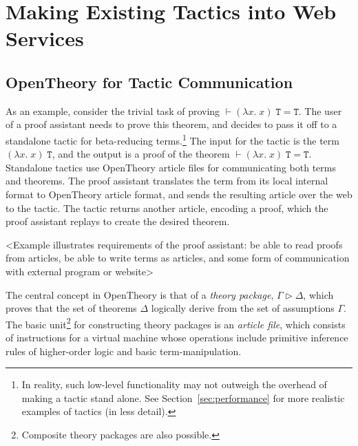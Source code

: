 \documentclass{llncs}
\newcommand{\OpenTheory}{OpenTheory\xspace}
\newcommand{\secref}[1]{Section~\ref{sec:#1}}
\begin{document}
\section{Making Existing Tactics into Web Services}
\label{sec:implementation}

\subsection{\OpenTheory for Tactic Communication}
As an example, consider the trivial task of proving $\vdash(\lambda{x}.\;x)\;\mathtt{T}=\mathtt{T}$.
The user of a proof assistant needs to prove this theorem, and decides to pass it off to a standalone tactic for beta-reducing terms.\footnote{In reality, such low-level functionality may not outweigh the overhead of making a tactic stand alone. See \secref{performance} for more realistic examples of tactics (in less detail).}
The input for the tactic is the term $(\lambda{x}.\;x)\;\mathtt{T}$, and the output is a proof of the theorem $\vdash(\lambda{x}.\;x)\;\mathtt{T}=\mathtt{T}$.
Standalone tactics use \OpenTheory article files for communicating both terms and theorems.
The proof assistant translates the term from its local internal format to \OpenTheory article format, and sends the resulting article over the web to the tactic.
The tactic returns another article, encoding a proof, which the proof assistant replays to create the desired theorem.

<Example illustrates requirements of the proof assistant: be able to read proofs from articles, be able to write terms as articles, and some form of communication with external program or website>

The central concept in \OpenTheory is that of a \emph{theory package}, $\Gamma\rhd\Delta$, which proves that the set of theorems $\Delta$ logically derive from the set of assumptions $\Gamma$.
The basic unit\footnote{Composite theory packages are also possible.} for constructing theory packages is an \emph{article file}, which consists of instructions for a virtual machine whose operations include primitive inference rules of higher-order logic and basic term-manipulation.
\end{document}
